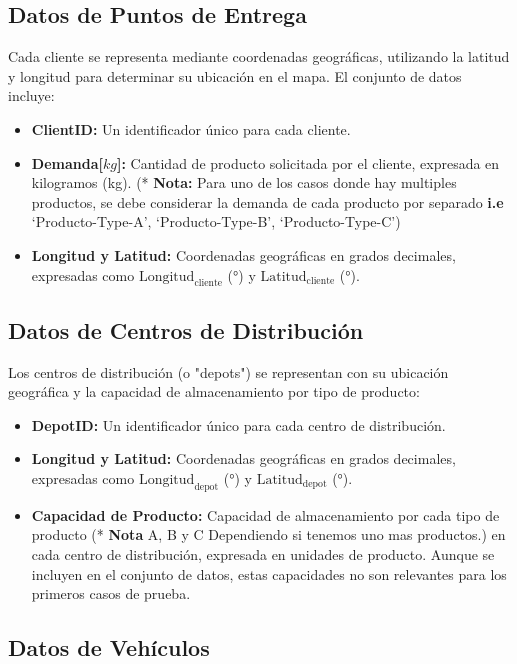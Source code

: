 \documentclass[12pt]{article}
\begin{document}
\subsection{Datos de Puntos de Entrega}

Cada cliente se representa mediante coordenadas geográficas, utilizando la latitud y longitud para determinar su ubicación en el mapa. El conjunto de datos incluye:
\begin{itemize}
    \item \textbf{ClientID:} Un identificador único para cada cliente.
    \item \textbf{Demanda[$kg$]:} Cantidad de producto solicitada por el cliente, expresada en kilogramos (kg). (* \textbf{Nota:} Para uno de los casos donde hay multiples productos, se debe considerar la demanda de cada producto por separado \textbf{i.e} `Producto-Type-A', `Producto-Type-B', `Producto-Type-C')
    \item \textbf{Longitud y Latitud:} Coordenadas geográficas en grados decimales, expresadas como $\text{Longitud}_{\text{cliente}}$ (°) y $\text{Latitud}_{\text{cliente}}$ (°).
\end{itemize}

\subsection{Datos de Centros de Distribución}

Los centros de distribución (o "depots") se representan con su ubicación geográfica y la capacidad de almacenamiento por tipo de producto:
\begin{itemize}
    \item \textbf{DepotID:} Un identificador único para cada centro de distribución.
    \item \textbf{Longitud y Latitud:} Coordenadas geográficas en grados decimales, expresadas como $\text{Longitud}_{\text{depot}}$ (°) y $\text{Latitud}_{\text{depot}}$ (°).
    \item \textbf{Capacidad de Producto:} Capacidad de almacenamiento por cada tipo de producto (* \textbf{Nota} A, B y C Dependiendo si tenemos uno mas productos.) en cada centro de distribución, expresada en unidades de producto. Aunque se incluyen en el conjunto de datos, estas capacidades no son relevantes para los primeros casos de prueba.
\end{itemize}

\subsection{Datos de Vehículos}
\end{document}
